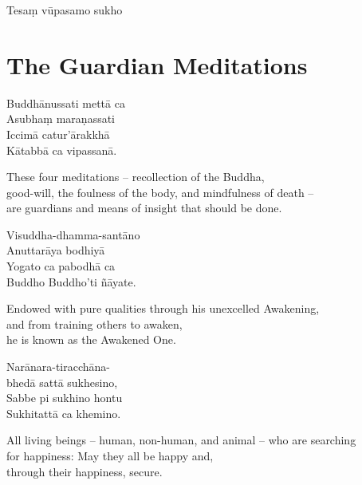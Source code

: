 
Tesaṃ vūpasamo sukho


\section{The Guardian Meditations}




\begin{leader}
\end{leader}

Buddhānussati mettā ca\\
Asubhaṃ maraṇassati\\
Iccimā catur'ārakkhā\\
Kātabbā ca vipassanā.

\begin{english}
  These four meditations -- recollection of the Buddha,\\
  good-will, the foulness of the body, and mindfulness of death --\\
  are guardians and means of insight that should be done.
\end{english}

Visuddha-dhamma-santāno\\
Anuttarāya bodhiyā\\
Yogato ca pabodhā ca\\
Buddho Buddho'ti ñāyate.

\begin{english}
  Endowed with pure qualities through his unexcelled Awakening,\\
  and from training others to awaken,\\
  he is known as the Awakened One.
\end{english}

Narānara-tiracchāna-\\
bhedā sattā sukhesino,\\
Sabbe pi sukhino hontu\\
Sukhitattā ca khemino.

\begin{english}
  All living beings -- human, non-human, and animal -- who are searching\\
  for happiness: May they all be happy and,\\
  through their happiness, secure.
\end{english}

